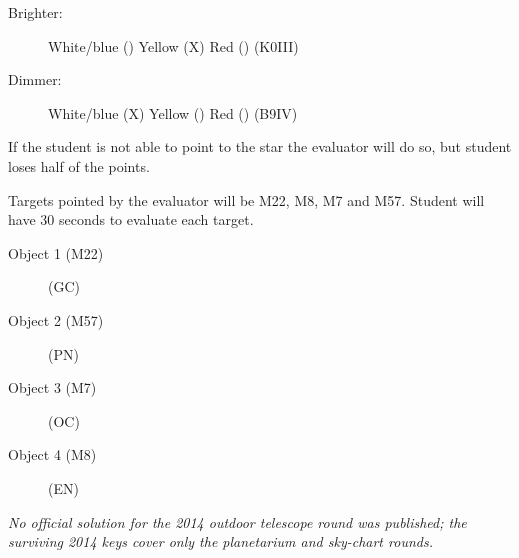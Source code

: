 \begin{description}
\item[Brighter:] White/blue (\quad) \qquad Yellow (X) \qquad
  Red (\quad) \hfill (K0III)
\item[Dimmer:] White/blue (X) \qquad Yellow (\quad) \qquad
  Red (\quad) \hfill (B9IV)
\end{description}

If the student is not able to point to the star the evaluator will do so, but
student loses half of the points.

Targets pointed by the evaluator will be M22, M8, M7 and M57. Student will
have 30 seconds to evaluate each target.

\begin{description}
\item[Object 1 (M22)] (GC)
\item[Object 2 (M57)] (PN)
\item[Object 3 (M7)] (OC)
\item[Object 4 (M8)] (EN)
\end{description}

\textit{No official solution for the 2014 outdoor telescope round was published; the surviving 2014 keys cover only the planetarium and sky-chart rounds.}

